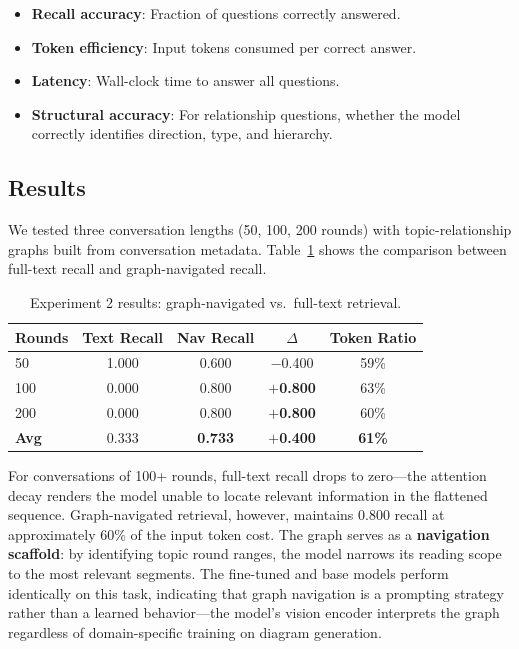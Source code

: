 \documentclass[11pt,a4paper]{article}
\begin{document}
\begin{itemize}[nosep]
\item \textbf{Recall accuracy}: Fraction of questions correctly answered.
\item \textbf{Token efficiency}: Input tokens consumed per correct answer.
\item \textbf{Latency}: Wall-clock time to answer all questions.
\item \textbf{Structural accuracy}: For relationship questions, whether the model correctly identifies direction, type, and hierarchy.
\end{itemize}

\subsection{Results}

We tested three conversation lengths (50, 100, 200 rounds) with topic-relationship graphs built from conversation metadata. Table~\ref{tab:exp2_res} shows the comparison between full-text recall and graph-navigated recall.

\begin{table}[h]
\centering
\caption{Experiment 2 results: graph-navigated vs.\ full-text retrieval.}
\label{tab:exp2_res}
\begin{tabular}{lcccc}
\toprule
\textbf{Rounds} & \textbf{Text Recall} & \textbf{Nav Recall} & \textbf{$\Delta$} & \textbf{Token Ratio} \\
\midrule
50  & 1.000 & 0.600 & $-$0.400 & 59\% \\
100 & 0.000 & 0.800 & \textbf{$+$0.800} & 63\% \\
200 & 0.000 & 0.800 & \textbf{$+$0.800} & 60\% \\
\midrule
\textbf{Avg} & 0.333 & \textbf{0.733} & \textbf{$+$0.400} & \textbf{61\%} \\
\bottomrule
\end{tabular}
\end{table}

For conversations of 100+ rounds, full-text recall drops to zero---the attention decay renders the model unable to locate relevant information in the flattened sequence. Graph-navigated retrieval, however, maintains 0.800 recall at approximately 60\% of the input token cost. The graph serves as a \textbf{navigation scaffold}: by identifying topic round ranges, the model narrows its reading scope to the most relevant segments. The fine-tuned and base models perform identically on this task, indicating that graph navigation is a prompting strategy rather than a learned behavior---the model's vision encoder interprets the graph regardless of domain-specific training on diagram generation.
\end{document}
